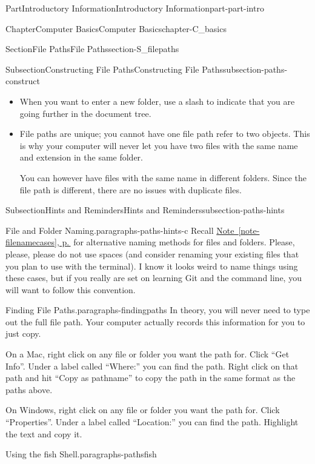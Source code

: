 \documentclass[twoside,10pt,]{book}
\newcommand{\xreffont}{\relax}
\begin{document}
\begin{partptx}{Part}{Introductory Information}{}{Introductory Information}{}{}{part-part-intro}
\begin{chapterptx}{Chapter}{Computer Basics}{}{Computer Basics}{}{}{chapter-C_basics}
\begin{sectionptx}{Section}{File Paths}{}{File Paths}{}{}{section-S_filepaths}
\begin{subsectionptx}{Subsection}{Constructing File Paths}{}{Constructing File Paths}{}{}{subsection-paths-construct}
\begin{itemize}[label=\textbullet]
\item{}When you want to enter a new folder, use a slash to indicate that you are going further in the document tree.%
\item{}File paths are unique; you cannot have one file path refer to two objects. This is why your computer will never let you have two files with the same name and extension in the same folder.%
\par
You can however have files with the same name in different folders. Since the file path is different, there are no issues with duplicate files.%
\end{itemize}
%
\end{subsectionptx}
%
%
\typeout{************************************************}
\typeout{************************************************}
%
\begin{subsectionptx}{Subsection}{Hints and Reminders}{}{Hints and Reminders}{}{}{subsection-paths-hints}
%
\begin{paragraphs}{File and Folder Naming.}{paragraphs-paths-hints-c}%
Recall \hyperref[note-filenamecases]{Note~{\xreffont\ref{note-filenamecases}}, p.\,\pageref{note-filenamecases}} for alternative naming methods for files and folders. Please, please, please do not use spaces (and consider renaming your existing files that you plan to use with the terminal). I know it looks weird to name things using these cases, but if you really are set on learning Git and the command line, you will want to follow this convention.%
\end{paragraphs}%
\begin{paragraphs}{Finding File Paths.}{paragraphs-findingpaths}%
%
In theory, you will never need to type out the full file path. Your computer actually records this information for you to just copy.%
\par
On a Mac, right click on any file or folder you want the path for. Click ``Get Info''. Under a label called ``Where:'' you can find the path. Right click on that path and hit ``Copy as pathname'' to copy the path in the same format as the paths above.%
\par
On Windows, right click on any file or folder you want the path for. Click ``Properties''. Under a label called ``Location:'' you can find the path. Highlight the text and copy it.%
\end{paragraphs}%
\begin{paragraphs}{Using the fish Shell.}{paragraphs-pathsfish}%

\end{paragraphs}
\end{subsectionptx}
\end{sectionptx}
\end{chapterptx}
\end{partptx}
\end{document}
